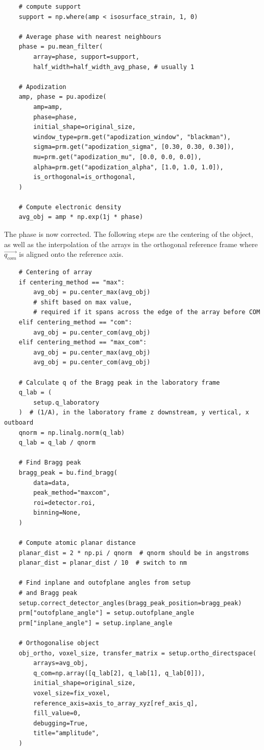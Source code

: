 \begin{verbatim}
    # compute support
    support = np.where(amp < isosurface_strain, 1, 0)
    
    # Average phase with nearest neighbours
    phase = pu.mean_filter(
        array=phase, support=support, 
        half_width=half_width_avg_phase, # usually 1
    
    # Apodization
    amp, phase = pu.apodize(
        amp=amp,
        phase=phase,
        initial_shape=original_size,
        window_type=prm.get("apodization_window", "blackman"),
        sigma=prm.get("apodization_sigma", [0.30, 0.30, 0.30]),
        mu=prm.get("apodization_mu", [0.0, 0.0, 0.0]),
        alpha=prm.get("apodization_alpha", [1.0, 1.0, 1.0]),
        is_orthogonal=is_orthogonal,
    )
    
    # Compute electronic density
    avg_obj = amp * np.exp(1j * phase)
\end{verbatim}
    
The phase is now corrected. The following steps are the centering of the object, as well as the interpolation of the arrays in the orthogonal reference frame where $\vec{q_{com}}$ is aligned onto the reference axis.
\begin{verbatim}
    # Centering of array
    if centering_method == "max":
        avg_obj = pu.center_max(avg_obj)
        # shift based on max value,
        # required if it spans across the edge of the array before COM
    elif centering_method == "com":
        avg_obj = pu.center_com(avg_obj)
    elif centering_method == "max_com":
        avg_obj = pu.center_max(avg_obj)
        avg_obj = pu.center_com(avg_obj)
        
    # Calculate q of the Bragg peak in the laboratory frame
    q_lab = (
        setup.q_laboratory
    )  # (1/A), in the laboratory frame z downstream, y vertical, x outboard
    qnorm = np.linalg.norm(q_lab)
    q_lab = q_lab / qnorm
    
    # Find Bragg peak
    bragg_peak = bu.find_bragg(
        data=data,
        peak_method="maxcom",
        roi=detector.roi,
        binning=None,
    )
    
    # Compute atomic planar distance
    planar_dist = 2 * np.pi / qnorm  # qnorm should be in angstroms
    planar_dist = planar_dist / 10  # switch to nm
        
    # Find inplane and outofplane angles from setup
    # and Bragg peak
    setup.correct_detector_angles(bragg_peak_position=bragg_peak)
    prm["outofplane_angle"] = setup.outofplane_angle
    prm["inplane_angle"] = setup.inplane_angle
        
    # Orthogonalise object
    obj_ortho, voxel_size, transfer_matrix = setup.ortho_directspace(
        arrays=avg_obj,
        q_com=np.array([q_lab[2], q_lab[1], q_lab[0]]),
        initial_shape=original_size,
        voxel_size=fix_voxel,
        reference_axis=axis_to_array_xyz[ref_axis_q],
        fill_value=0,
        debugging=True,
        title="amplitude",
    )
\end{verbatim}

